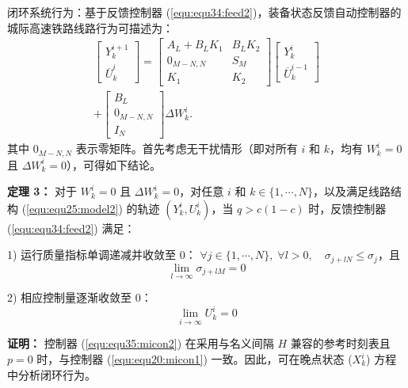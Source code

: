 闭环系统行为：基于反馈控制器 (\ref{equ:equ34:feed2})，装备状态反馈自动控制器的城际高速铁路线路行为可描述为：
\begin{equation}
	\begin{gathered}
		{\left[\begin{array}{c}
				Y_{k}^{i+1} \\
				\overline{U}_{k}^{i}
			\end{array}\right]=\left[\begin{array}{cc}
				A_{L}+B_{L} K_{1} & B_{L} K_{2} \\
				0_{M-N, N} & S_{M} \\
				K_{1} & K_{2}
			\end{array}\right]\left[\begin{array}{c}
				Y_{k}^{i} \\
				\overline{U}_{k}^{i-1}
			\end{array}\right]} \\
		+\left[\begin{array}{c}
			B_{L} \\
			0_{M-N, N} \\
			I_{N}
		\end{array}\right] \Delta W_{k}^{i}.
	\end{gathered}
\end{equation}
其中 $0_{M-N,N}$ 表示零矩阵。首先考虑无干扰情形（即对所有 $i$ 和 $k$，均有 $W_k^i=0$ 且 $\Delta W_{k}^{i}=0$），可得如下结论。

\textbf{定理 3：} 对于 $W_k^i=0$ 且 $\Delta W_{k}^{i}=0$，对任意 $i$ 和 $k\in \{ 1,\cdots,N \}$，以及满足线路结构 (\ref{equ:equ25:model2}) 的轨迹 $\left(Y_{k}^{i}, U_{k}^{i}\right)$，当 $q>c(1-c)$ 时，反馈控制器 (\ref{equ:equ34:feed2}) 满足：

1) 运行质量指标单调递减并收敛至 0：  
$\forall j \in\{1, \cdots, N\}, \; \forall l>0, \quad \sigma_{j+l N} \leq \sigma_{j}$，且
$$
\lim _{l \rightarrow \infty} \sigma_{j+l M}=0
$$

2) 相应控制量逐渐收敛至 0：
\begin{equation*}
	\lim _{i \rightarrow \infty} U_{k}^{i}=0
\end{equation*}

\textbf{证明：} 控制器 (\ref{equ:equ35:micon2}) 在采用与名义间隔 $H$ 兼容的参考时刻表且 $p=0$ 时，与控制器 (\ref{equ:equ20:micon1}) 一致。因此，可在晚点状态 ($X_k^i$) 方程中分析闭环行为。

